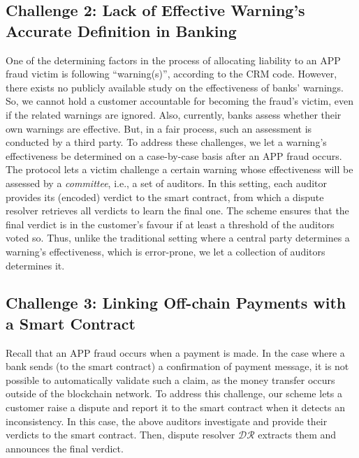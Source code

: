 


\vspace{-3mm}
\subsection{Challenge 2: Lack of Effective Warning's Accurate Definition in Banking}\label{sec::Lack-of-Effective-Warning-Definition}


One of the determining factors in the process of allocating liability to an APP fraud victim is following ``warning(s)'', according to the CRM code. However, there exists no publicly available study on the effectiveness of banks' warnings. So, we cannot hold a customer accountable for becoming the fraud's victim,  even if the related warnings are ignored. Also, currently,  banks assess whether their own warnings are effective. But, in a fair process, such an assessment is conducted by a third party.  To address these challenges, we let a warning's effectiveness be determined on a case-by-case basis after an APP fraud occurs. The protocol lets a victim challenge a certain warning whose effectiveness will be assessed by a \emph{committee}, i.e., a  set of auditors. In this setting, each auditor provides its (encoded) verdict to the smart contract, from which a dispute resolver retrieves all verdicts to learn the final one. The scheme ensures that the final verdict is in the customer's favour if at least a threshold of the auditors voted so. Thus, unlike the traditional setting where a central party determines a warning's effectiveness, which is error-prone, we let a collection of auditors determines it.



\vspace{-3.5mm}

\subsection{Challenge 3: Linking Off-chain Payments with a Smart Contract}\label{sec::Linking Off-chain-Payments-with-contract}
 Recall that an APP fraud occurs when a payment is made. In the case where a  bank sends  (to the smart contract) a confirmation of payment message, it is not possible to automatically validate such a claim, as the money transfer occurs outside of the blockchain network. To address this challenge, our scheme lets a customer raise a dispute and report it to the smart contract when it detects an inconsistency. In this case, the above auditors investigate and provide their verdicts to the smart contract. Then, dispute resolver $\mathcal{DR}$ extracts them and announces the final verdict. 


